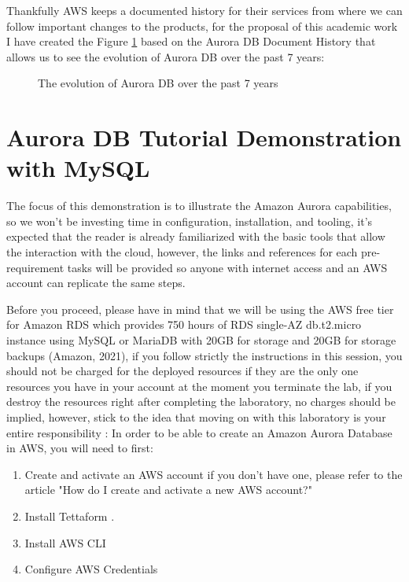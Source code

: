 \documentclass{article}
\begin{document}
Thankfully AWS keeps a documented history for their services from where we can follow important changes to the products, for the proposal of this academic work I have created the Figure \ref{fig:AmazonAuroraOverTheYears} based on the Aurora DB Document History \cite{awsdocumentedhistory} that allows us to see the evolution of Aurora DB over the past 7 years:

\begin{figure}[hbt!]
\centering
\caption{\label{fig:AmazonAuroraOverTheYears}The evolution of Aurora DB over the past 7 years }
\end{figure}
\clearpage

\section{Aurora DB Tutorial Demonstration with MySQL}

The focus of this demonstration is to illustrate the Amazon Aurora capabilities, so we won’t be investing time in configuration, installation, and tooling, it’s expected that the reader is already familiarized with the basic tools that allow the interaction with the cloud, however, the links and references for each pre-requirement tasks will be provided so anyone with internet access and an AWS account can replicate the same steps.

Before you proceed, please have in mind that we will be using the AWS free tier for Amazon RDS which provides 750 hours of RDS single-AZ db.t2.micro instance using MySQL or MariaDB with 20GB for storage and 20GB for storage backups (Amazon, 2021), if you follow strictly the instructions in this session, you should not be charged for the deployed resources if they are the only one resources you have in your account at the moment you terminate the lab, if you destroy the resources right after completing the laboratory, no charges should be implied, however, stick to the idea that moving on with this laboratory is your entire responsibility :
In order to be able to create an Amazon Aurora Database in AWS, you will need to first:

\begin{enumerate}
\item Create and activate an AWS account if you don’t have one, please refer to the article "How do I create and activate a new AWS account?" \cite{createaccount}
\item Install Tettaform \cite{installterraform}. 
\item Install AWS CLI  \cite{installawscli}
\item Configure AWS Credentials \cite{configurecredentials}
\end{enumerate}
\end{document}
